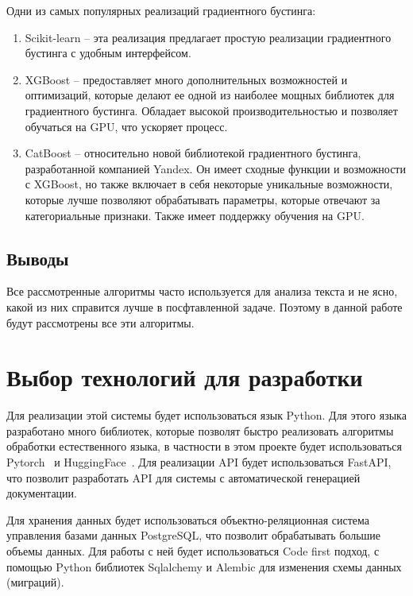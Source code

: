 \documentclass[PI, VKR]{HSEUniversity}
\begin{document}
Одни из самых популярных реализаций градиентного бустинга:
\begin{enumerate}
\item Scikit-learn -- эта реализация предлагает простую реализации градиентного бустинга с удобным интерфейсом.
\item XGBoost\autocite{chen_xgboost_2016} -- предоставляет много дополнительных возможностей и оптимизаций, которые делают ее одной из наиболее мощных библиотек для градиентного бустинга. Обладает высокой производительностью и позволяет обучаться на GPU\autocite{mitchell_accelerating_2017}, что ускоряет процесс.
\item CatBoost\autocite{prokhorenkova_catboost_2018} -- относительно новой библиотекой градиентного бустинга, разработанной компанией Yandex. Он имеет сходные функции и возможности с XGBoost, но также включает в себя некоторые уникальные возможности, которые лучше позволяют обрабатывать параметры, которые отвечают за категориальные признаки. Также имеет поддержку обучения на GPU\autocite{dorogush_catboost_2018}.
\end{enumerate}
\subsection{Выводы}
\label{sec:org590c17c}
Все рассмотренные алгоритмы часто используется для анализа текста и не ясно, какой из них справится лучше в посфтавленной задаче. Поэтому в данной работе будут рассмотрены все эти алгоритмы.
\section{Выбор технологий для разработки}
\label{sec:org00caba6}
Для реализации этой системы будет использоваться язык Python\autocite{vanrossum_python_2009}. Для этого языка разработано много библиотек, которые позволят быстро реализовать алгоритмы обработки естественного языка, в частности в этом проекте будет использоваться Pytorch~\autocite{paszke_pytorch_2019} и HuggingFace~\autocite{wolf_transformers_2020}. Для реализации API будет использоваться FastAPI, что позволит разработать API для системы с автоматической генерацией документации.

Для хранения данных будет использоваться объектно-реляционная система управления базами данных PostgreSQL, что позволит обрабатывать большие объемы данных. Для работы с ней будет использоваться Code first подход, с помощью Python библиотек Sqlalchemy и Alembic для изменения схемы данных (миграций).
\end{document}
